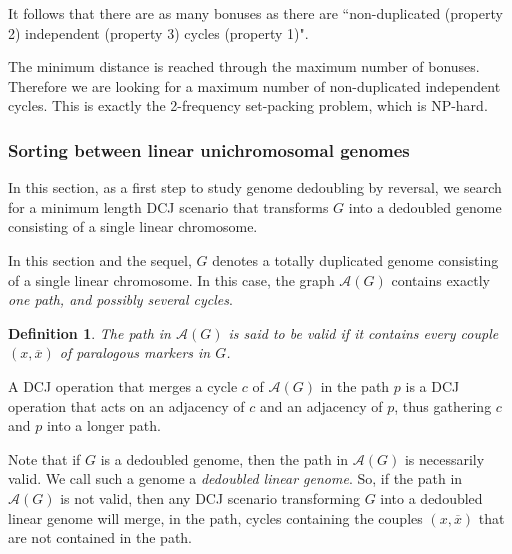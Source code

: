 \documentclass[11pt,final,twoside,nofrench]{thlifl}
\newcommand{\snd}[1]{ \ensuremath{\overline{#1}} }
\newtheorem{definition}{Definition}
\begin{document}
It follows that there are as many bonuses as there are ``non-duplicated (property 2) independent (property 3) cycles (property 1)".

The minimum distance is reached through the maximum number of bonuses. Therefore we are looking for a maximum number of non-duplicated independent cycles. This is exactly the 2-frequency set-packing problem, which is NP-hard.

\subsubsection{Sorting between linear unichromosomal genomes}

In this section, as a first step to study genome dedoubling by reversal, we search for a minimum length DCJ scenario that transforms
$G$ into a dedoubled genome consisting of a single linear chromosome.

In this section and the sequel, $G$ denotes a totally 
duplicated genome consisting of a single linear chromosome. In this case,
the graph $\mathcal{A}(G)$ contains exactly \emph{one path, and possibly several
cycles}.

\begin{definition}
The path in $\mathcal{A}(G)$ is said to be \emph{valid} if it contains every 
couple $(x,\snd{x})$ of paralogous markers in $G$.
\end{definition}

A DCJ operation that merges a cycle $c$ of $\mathcal{A}(G)$ in the path $p$
is a DCJ operation that acts on an adjacency of $c$ and an adjacency of $p$,
thus gathering $c$ and $p$ into a longer path.

Note that if $G$ is a dedoubled genome, then the path in $\mathcal{A}(G)$ is 
necessarily valid. We call such a genome a \emph{dedoubled linear genome}. So, 
if 
the path in $\mathcal{A}(G)$ is not valid, then any DCJ scenario transforming 
$G$ into a dedoubled linear genome will merge, in the path, cycles
containing the couples  $(x,\snd{x})$ that are not contained in the path.
\end{document}
